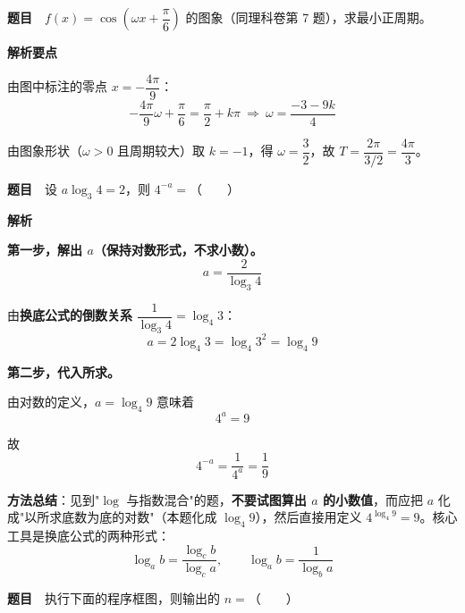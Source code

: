 \par\medskip


\textbf{题目}　$f(x)=\cos\left(\omega x+\dfrac\pi6\right)$ 的图象（同理科卷第 7 题），求最小正周期。

\begin{center}\end{center}

\textbf{解析要点}

由图中标注的零点 $x=-\dfrac{4\pi}9$：
\[-\frac{4\pi}9\omega+\frac\pi6=\frac\pi2+k\pi\ \Longrightarrow\ \omega=\frac{-3-9k}4\]

由图象形状（$\omega>0$ 且周期较大）取 $k=-1$，得 $\omega=\dfrac32$，故 $T=\dfrac{2\pi}{3/2}=\dfrac{4\pi}3$。


\par\medskip


\textbf{题目}　设 $a\log_3 4=2$，则 $4^{-a}=$（　　）

\textbf{解析}

\textbf{第一步，解出 $a$（保持对数形式，不求小数）。}
\[a=\frac2{\log_3 4}\]

由\textbf{换底公式的倒数关系} $\dfrac1{\log_3 4}=\log_4 3$：
\[a=2\log_4 3=\log_4 3^{2}=\log_4 9\]

\textbf{第二步，代入所求。}

由对数的定义，$a=\log_4 9$ 意味着
\[4^{a}=9\]

故
\[4^{-a}=\frac1{4^{a}}=\frac19\]


\begin{gktip}
\textbf{方法总结}：见到"$\log$ 与指数混合"的题，\textbf{不要试图算出 $a$ 的小数值}，而应把 $a$ 化成"以所求底数为底的对数"（本题化成 $\log_4 9$），然后直接用定义 $4^{\log_4 9}=9$。核心工具是换底公式的两种形式：
\[\log_a b=\frac{\log_c b}{\log_c a},\qquad \log_a b=\frac1{\log_b a}\]
\end{gktip}

\par\medskip


\textbf{题目}　执行下面的程序框图，则输出的 $n=$（　　）

\begin{center}\end{center}

